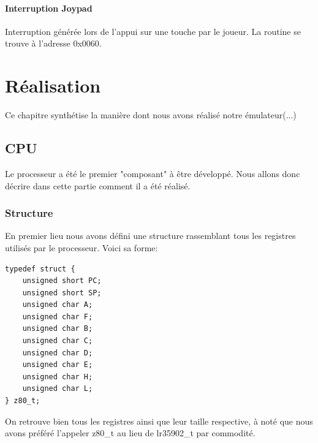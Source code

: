 \documentclass{report}
\begin{document}
\subsubsection{Interruption Joypad}
Interruption générée lors de l'appui sur une touche par le joueur. La routine se trouve à l'adresse 0x0060.
\chapter{Réalisation}
Ce chapitre synthétise la manière dont nous avons réalisé notre émulateur(...)
\section{CPU}
Le processeur a été le premier "composant" à être développé. Nous allons donc décrire dans cette partie comment il a été réalisé.
\subsection{Structure}
En premier lieu nous avons défini une structure rassemblant tous les registres utilisés par le processeur.
Voici sa forme:
\begin{lstlisting}
typedef struct {
	unsigned short PC;
	unsigned short SP;
	unsigned char A;
	unsigned char F;
	unsigned char B;
	unsigned char C;
	unsigned char D;
	unsigned char E;
	unsigned char H;
	unsigned char L;	
} z80_t;
\end{lstlisting}
On retrouve bien tous les registres ainsi que leur taille respective, à noté que nous avons préféré l'appeler z80\_t au lieu de lr35902\_t par commodité.
\end{document}
